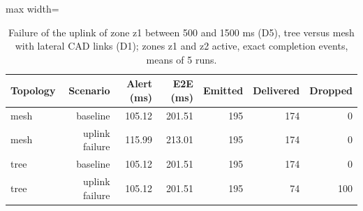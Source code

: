 \begin{table}[htbp]
\centering
\caption{Failure of the uplink of zone z1 between 500 and 1500 ms (D5), tree versus mesh with lateral CAD links (D1); zones z1 and z2 active, exact completion events, means of 5 runs.}
\label{tab:faults}
\begin{adjustbox}{max width=\textwidth}
\begin{tabular}{lrrrrrr}
\toprule
Topology & Scenario & Alert (ms) & E2E (ms) & Emitted & Delivered & Dropped \\
\midrule
mesh & baseline & 105.12 & 201.51 & 195 & 174 & 0 \\
mesh & uplink failure & 115.99 & 213.01 & 195 & 174 & 0 \\
tree & baseline & 105.12 & 201.51 & 195 & 174 & 0 \\
tree & uplink failure & 105.12 & 201.51 & 195 & 74 & 100 \\
\bottomrule
\end{tabular}
\end{adjustbox}
\end{table}

